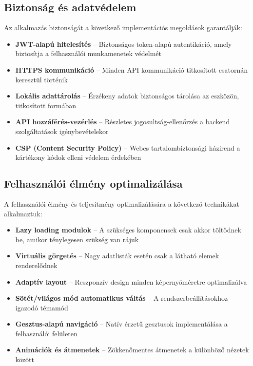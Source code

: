 \documentclass[12pt]{report}
\begin{document}
\subsection{Biztonság és adatvédelem}
Az alkalmazás biztonságát a következő implementációs megoldások garantálják:
\begin{itemize}
    \item \textbf{JWT-alapú hitelesítés} -- Biztonságos token-alapú autentikáció, amely biztosítja a felhasználói munkamenetek védelmét
    \item \textbf{HTTPS kommunikáció} -- Minden API kommunikáció titkosított csatornán keresztül történik
    \item \textbf{Lokális adattárolás} -- Érzékeny adatok biztonságos tárolása az eszközön, titkosított formában
    \item \textbf{API hozzáférés-vezérlés} -- Részletes jogosultság-ellenőrzés a backend szolgáltatások igénybevételekor
    \item \textbf{CSP (Content Security Policy)} -- Webes tartalombiztonsági házirend a kártékony kódok elleni védelem érdekében
\end{itemize}

\subsection{Felhasználói élmény optimalizálása}
A felhasználói élmény és teljesítmény optimalizálására a következő technikákat alkalmaztuk:
\begin{itemize}
    \item \textbf{Lazy loading modulok} -- A szükséges komponensek csak akkor töltődnek be, amikor ténylegesen szükség van rájuk
    \item \textbf{Virtuális görgetés} -- Nagy adatlisták esetén csak a látható elemek renderelődnek
    \item \textbf{Adaptív layout} -- Reszponzív design minden képernyőméretre optimalizálva
    \item \textbf{Sötét/világos mód automatikus váltás} -- A rendszerbeállításokhoz igazodó témamód
    \item \textbf{Gesztus-alapú navigáció} -- Natív érzetű gesztusok implementálása a felhasználói felületen
    \item \textbf{Animációk és átmenetek} -- Zökkenőmentes átmenetek a különböző nézetek között
\end{itemize}
\end{document}
